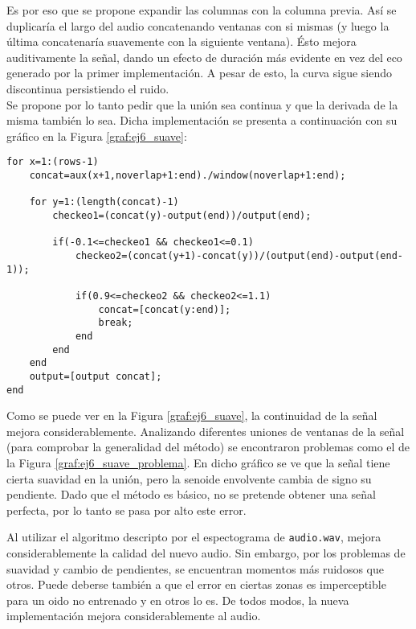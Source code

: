 	Es por eso que se propone expandir las columnas con la columna previa. Así se duplicaría el largo del audio concatenando ventanas con si mismas (y luego la última concatenaría suavemente con la siguiente ventana). Ésto mejora auditivamente la señal, dando un efecto de duración más evidente en vez del eco generado por la primer implementación. A pesar de esto, la curva sigue siendo discontinua persistiendo el ruido.\\

	Se propone por lo tanto pedir que la unión sea continua y que la derivada de la misma también lo sea. Dicha implementación se presenta a continuación con su gráfico en la Figura \ref{graf:ej6_suave}:

	\begin{lstlisting}
for x=1:(rows-1)
	concat=aux(x+1,noverlap+1:end)./window(noverlap+1:end);

	for y=1:(length(concat)-1)
		checkeo1=(concat(y)-output(end))/output(end);

		if(-0.1<=checkeo1 && checkeo1<=0.1)
			checkeo2=(concat(y+1)-concat(y))/(output(end)-output(end-1));

			if(0.9<=checkeo2 && checkeo2<=1.1)
				concat=[concat(y:end)];
				break;
			end
		end
	end
	output=[output concat];
end
	\end{lstlisting}


	Como se puede ver en la Figura \ref{graf:ej6_suave}, la continuidad de la señal mejora considerablemente. Analizando diferentes uniones de ventanas de la señal (para comprobar la generalidad del método) se encontraron problemas como el de la Figura \ref{graf:ej6_suave_problema}. En dicho gráfico se ve que la señal tiene cierta suavidad en la unión, pero la senoide envolvente cambia de signo su pendiente. Dado que el método es básico, no se pretende obtener una señal perfecta, por lo tanto se pasa por alto este error.

	Al utilizar el algoritmo descripto por el espectograma de \texttt{audio.wav}, mejora considerablemente la calidad del nuevo audio. Sin embargo, por los problemas de suavidad y cambio de pendientes, se encuentran momentos más ruidosos que otros. Puede deberse también a que el error en ciertas zonas es imperceptible para un oido no entrenado y en otros lo es. De todos modos, la nueva implementación mejora considerablemente al audio.
